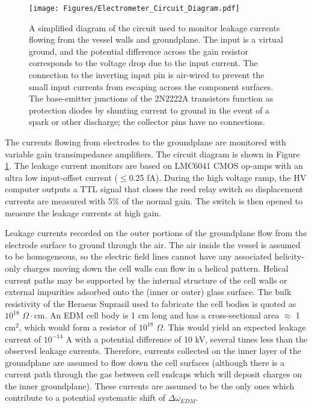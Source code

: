 \documentclass [10pt, twoside] {uwthesis}[2012/04/02]
\begin{document}
\begin{figure}
\begin{center}
\texttt{[image: Figures/Electrometer\_Circuit\_Diagram.pdf]}
\end{center}
\caption[Circuit diagram of leakage current monitors]
{\narrower A simplified diagram of the circuit used to monitor leakage currents flowing from the vessel walls and groundplane. The input is a virtual ground, and the potential difference across the gain resistor corresponds to the voltage drop due to the input current. The connection to the inverting input pin is air-wired to prevent the small input currents from escaping across the component surfaces. The base-emitter junctions of the 2N2222A transistors function as protection diodes by shunting current to ground in the event of a spark or other discharge; the collector pins have no connections.}
\label{ElectrometerDiagram}
\end{figure}

The currents flowing from electrodes to the groundplane are monitored with variable gain transimpedance amplifiers. The circuit diagram is shown in Figure \ref{ElectrometerDiagram}. The leakage current monitors are based on LMC6041 CMOS op-amps with an ultra low input-offset current ($\leq$0.25 fA). During the high voltage ramp, the HV computer outputs a TTL signal that closes the reed relay switch so displacement currents are measured with 5\% of the normal gain. The switch is then opened to measure the leakage currents at high gain. 

Leakage currents recorded on the outer portions of the groundplane flow from the electrode surface to ground through the air. The air inside the vessel is assumed to be homogeneous, so the electric field lines cannot have any associated helicity-only charges moving down the cell walls can flow in a helical pattern. Helical current paths may be supported by the internal structure of the cell walls or external impurities adsorbed onto the (inner or outer) glass surface. The bulk resistivity of the Heraeus Suprasil used to fabricate the cell bodies is quoted as $10^{18}$ $\Omega \cdot$cm. An EDM cell body is 1 cm long and has a cross-sectional area $\approx$ 1 cm$^2$, which would form a resistor of $10^{18}$ $\Omega$. This would yield an expected leakage current of $10^{-14}$ A with a potential difference of 10 kV, several times less than the observed leakage currents. Therefore, currents collected on the inner layer of the groundplane are assumed to flow down the cell surfaces (although there is a current path through the gas between cell endcaps which will deposit charges on the inner groundplane). These currents are assumed to be the only ones which contribute to a potential systematic shift of $\Delta\omega_{EDM}$.
\end{document}
